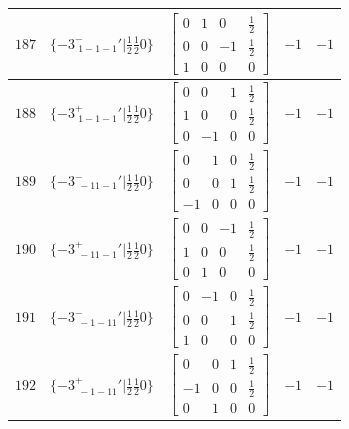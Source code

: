\documentclass[fleqn,8pt]{jsarticle}
\begin{document}
\begin{longtable}{ccccc}
$ 187 $ & $ \{-3^{-}_{\,\,1-1-1}{}'|\frac{1}{2} \frac{1}{2} 0\} $ & $ \begin{bmatrix} 0 & 1 & 0 & \frac{1}{2} \\ 0 & 0 & -1 & \frac{1}{2} \\ 1 & 0 & 0 & 0 \end{bmatrix} $ & $ -1 $ & $ -1 $ \\ \hline
$ 188 $ & $ \{-3^{+}_{\,\,1-1-1}{}'|\frac{1}{2} \frac{1}{2} 0\} $ & $ \begin{bmatrix} 0 & 0 & 1 & \frac{1}{2} \\ 1 & 0 & 0 & \frac{1}{2} \\ 0 & -1 & 0 & 0 \end{bmatrix} $ & $ -1 $ & $ -1 $ \\ \hline
$ 189 $ & $ \{-3^{-}_{\,\,-11-1}{}'|\frac{1}{2} \frac{1}{2} 0\} $ & $ \begin{bmatrix} 0 & 1 & 0 & \frac{1}{2} \\ 0 & 0 & 1 & \frac{1}{2} \\ -1 & 0 & 0 & 0 \end{bmatrix} $ & $ -1 $ & $ -1 $ \\ \hline
$ 190 $ & $ \{-3^{+}_{\,\,-11-1}{}'|\frac{1}{2} \frac{1}{2} 0\} $ & $ \begin{bmatrix} 0 & 0 & -1 & \frac{1}{2} \\ 1 & 0 & 0 & \frac{1}{2} \\ 0 & 1 & 0 & 0 \end{bmatrix} $ & $ -1 $ & $ -1 $ \\ \hline
$ 191 $ & $ \{-3^{-}_{\,\,-1-11}{}'|\frac{1}{2} \frac{1}{2} 0\} $ & $ \begin{bmatrix} 0 & -1 & 0 & \frac{1}{2} \\ 0 & 0 & 1 & \frac{1}{2} \\ 1 & 0 & 0 & 0 \end{bmatrix} $ & $ -1 $ & $ -1 $ \\ \hline
$ 192 $ & $ \{-3^{+}_{\,\,-1-11}{}'|\frac{1}{2} \frac{1}{2} 0\} $ & $ \begin{bmatrix} 0 & 0 & 1 & \frac{1}{2} \\ -1 & 0 & 0 & \frac{1}{2} \\ 0 & 1 & 0 & 0 \end{bmatrix} $ & $ -1 $ & $ -1 $ \\
\end{longtable}
\end{document}
